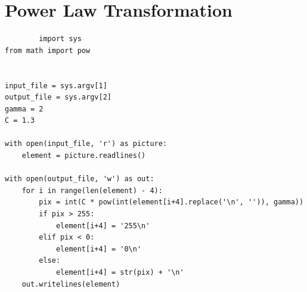 \documentclass[a4paper,8pt]{article}
\begin{document}
        \section{Power Law Transformation}
        \begin{verbatim}
        import sys
from math import pow


input_file = sys.argv[1]
output_file = sys.argv[2]
gamma = 2
C = 1.3

with open(input_file, 'r') as picture:
    element = picture.readlines()

with open(output_file, 'w') as out:
    for i in range(len(element) - 4):
        pix = int(C * pow(int(element[i+4].replace('\n', '')), gamma))
        if pix > 255:
            element[i+4] = '255\n'
        elif pix < 0:
            element[i+4] = '0\n'
        else:
            element[i+4] = str(pix) + '\n'
    out.writelines(element)


        \end{verbatim}
        
\end{document}
